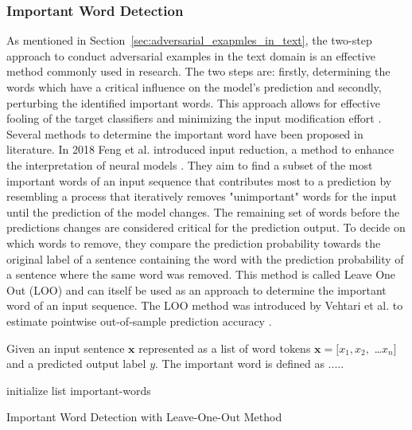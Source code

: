\subsubsection{Important Word Detection}
\label{sec:iwd_method}
As mentioned in Section~\ref{sec:adversarial_exapmles_in_text}, the two-step approach to conduct adversarial examples in the text domain is an effective method commonly used in research. The two steps are: firstly, determining the words which have a critical influence on the model's prediction and secondly, perturbing the identified important words. This approach allows for effective fooling of the target classifiers and minimizing the input modification effort \cite{jin2019bert}.  Several methods to determine the important word have been proposed in literature.
In 2018 Feng et al. introduced input reduction, a method to enhance the interpretation of neural models \cite{feng2018pathologies}. They aim to find a subset of the most important words of an input sequence that contributes most to a prediction by resembling a process that iteratively removes "unimportant" words for the input until the prediction of the model changes. The remaining set of words before the predictions changes are considered critical for the prediction output. To decide on which words to remove, they compare the prediction probability towards the original label of a sentence containing the word with the prediction probability of a sentence where the same word was removed. This method is called Leave One Out (LOO) and can itself be used as an approach to determine the important word of an input sequence. The LOO method was introduced by Vehtari et al. to estimate pointwise out-of-sample prediction accuracy \cite{vehtari2017practical}. 

Given an input sentence $\textbf{x}$ represented as a list of word tokens ${\textbf{x} = [x_1, x_2,}$ \dots${x_n]}$ and a predicted output label $y$. The important word is defined as 
.....

\IncMargin{1em}
\begin{algorithm}[H]
\SetAlgoLined
{}
\DontPrintSemicolon
\Indm 
\Indp
 initialize list important-words\;
 \caption{Important Word Detection with Leave-One-Out Method}
\end{algorithm}
\DecMargin{1em}



